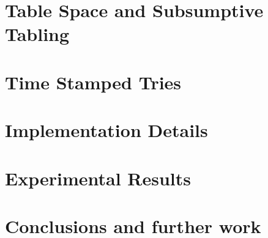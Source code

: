 \documentclass[11pt]{report}
\begin{document}
\chapter{Table Space and Subsumptive Tabling}


\chapter{Time Stamped Tries}


\chapter{Implementation Details}
\chapter{Experimental Results}
\chapter{Conclusions and further work}
  
\renewcommand{\bibname}{References}

{}
\end{document}
